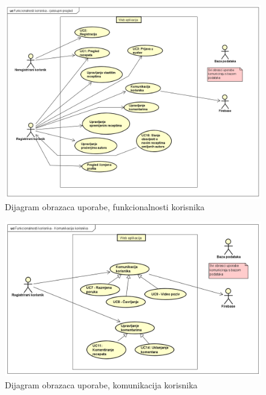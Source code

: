 					\begin{figure}[H]
						\includegraphics[scale= 0.42]{slike/UseCase Diagram0.png}
						\centering
						\caption{Dijagram obrazaca uporabe, funkcionalnosti korisnika}
						\label{fig:Dijagram obrazaca uporabe, funkcionalnosti korisnika}
					\end{figure}
					\eject
					\begin{figure}[H]
						\includegraphics[scale= 0.42]{slike/UseCase Diagram1.png}
						\centering
						\caption{Dijagram obrazaca uporabe, komunikacija korisnika}
						\label{fig:Dijagram obrazaca uporabe, komunikacija korisnika}
					\end{figure}
